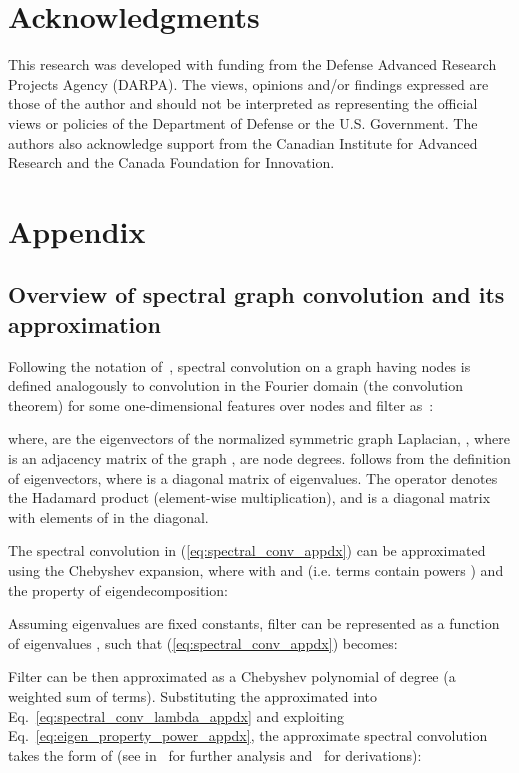 \documentclass[final,nonatbib]{article} \usepackage{nips_2018}
\begin{document}
	\section*{Acknowledgments}
	This research was developed with funding from the Defense Advanced Research Projects Agency (DARPA). The views, opinions and/or findings expressed are those of the author and should not be interpreted as representing the official views or policies of the Department of Defense or the U.S. Government.
	The authors also acknowledge support from the Canadian Institute for Advanced Research and the Canada Foundation for Innovation.

	
	
	\vfill

	\pagebreak
	\vfill

	\section*{Appendix}


	\subsection{Overview of spectral graph convolution and its approximation}
	\label{sec:spectral_graph_conv_details}

	Following the notation of~\cite{defferrard2016convolutional}, spectral convolution on a graph  having  nodes is defined analogously to convolution in the Fourier domain (the convolution theorem) for some one-dimensional features over nodes  and filter  as~\cite{bruna2013spectral,bronstein2017geometric}:

where,  are the eigenvectors of the normalized symmetric graph Laplacian, , where  is an adjacency matrix of the graph ,  are node degrees.
	 follows from the definition of eigenvectors, where  is a diagonal matrix of eigenvalues. The operator  denotes the Hadamard product (element-wise multiplication),  and  is a diagonal matrix with elements of  in the diagonal.

	The spectral convolution in (\ref{eq:spectral_conv_appdx}) can be approximated using the Chebyshev expansion, where  with  and  (i.e.  terms contain powers ) and the property of eigendecomposition:


	Assuming eigenvalues  are fixed constants, filter  can be represented as a function of eigenvalues , such that (\ref{eq:spectral_conv_appdx}) becomes:


	Filter  can be then approximated as a Chebyshev polynomial of degree  (a weighted sum of  terms).
	Substituting the approximated  into Eq.~\ref{eq:spectral_conv_lambda_appdx} and exploiting Eq.~\ref{eq:eigen_property_power_appdx}, the approximate spectral convolution takes the form of (see in~\cite{defferrard2016convolutional, kipf2016semi} for further analysis and~\cite{hammond2011wavelets} for derivations):
\end{document}
